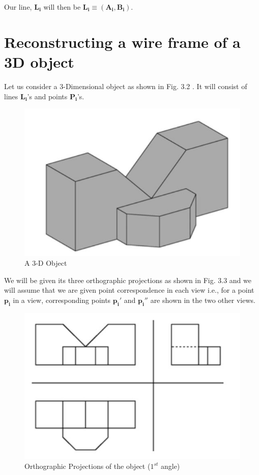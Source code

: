 \documentclass[a4paper,11pt,openany]{book}
\begin{document}
Our line, $\boldsymbol{L_i}$ will then be $\boldsymbol{L_i \equiv (A_i, B_i)}$. 

\section{Reconstructing a wire frame of a 3D object}
Let us consider a 3-Dimensional object as shown in Fig. 3.2 . It will consist of lines $\boldsymbol{L_i}$'s and points $\boldsymbol{P_i}$'s.
\begin{figure}[h]
\centering
\includegraphics[scale=0.3]{3DModel}
\caption{A 3-D Object}
\end{figure}


We will be given its three orthographic projections as shown in Fig. 3.3 and we will assume that we are given point correspondence in each view i.e., for a point $\boldsymbol{p_i}$ in a view, corresponding points $\boldsymbol{p_i'}$ and $\boldsymbol{p_i''}$ are shown in the two other views.

\begin{figure}[h]
\centering
\includegraphics[scale=0.6]{OrthographicProjections}
\caption{Orthographic Projections of the object ($1^{st}$ angle)}
\end{figure}
\end{document}
